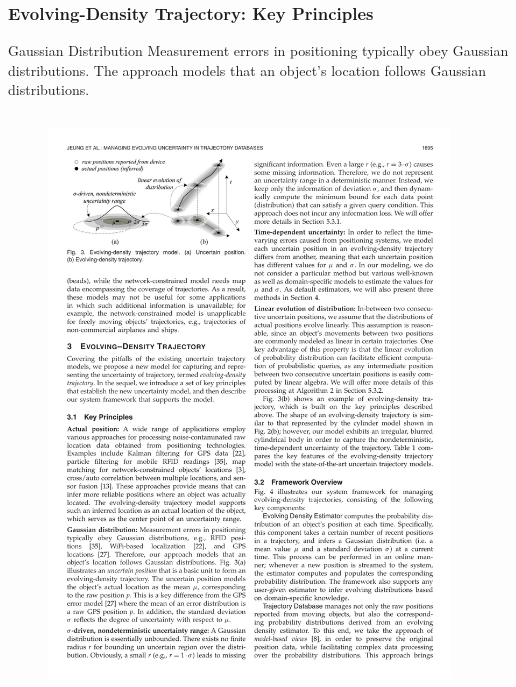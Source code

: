 \begin{frame}
\frametitle{Evolving-Density Trajectory: Key Principles}

\begin{block}{Gaussian Distribution}
  Measurement errors in positioning typically obey Gaussian distributions. The approach models that an object's location follows Gaussian distributions.
\end{block}

\begin{columns}

  \begin{figure}[tb]
    \includegraphics[width=\columnwidth]{figures/5-1/5-1-2.pdf}
  \end{figure}

  \begin{example}
  \end{example}

\end{columns}

\end{frame}

